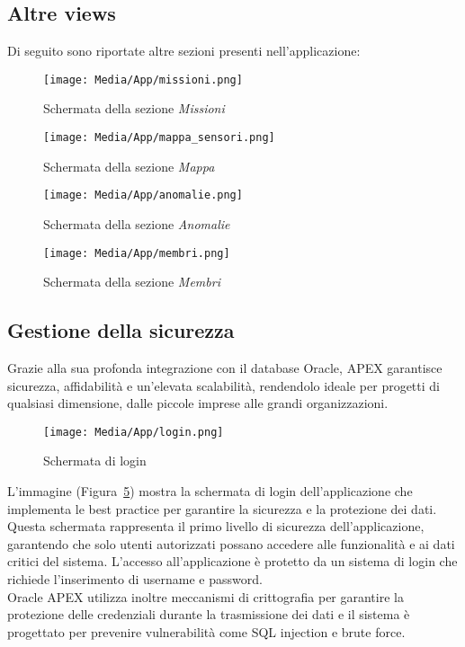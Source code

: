 \subsection{Altre views}
Di seguito sono riportate altre sezioni presenti nell'applicazione:
\begin{figure}[ht!]
    \centering
    \texttt{[image: Media/App/missioni.png]}
    \caption{Schermata della sezione \textit{Missioni}}
    \label{fig:missioni}
\end{figure}
\begin{figure}[ht!]
    \centering
    \texttt{[image: Media/App/mappa\_sensori.png]}
    \caption{Schermata della sezione \textit{Mappa}}
    \label{fig:mappa}
\end{figure}
\begin{figure}[ht!]
    \centering
    \texttt{[image: Media/App/anomalie.png]}
    \caption{Schermata della sezione \textit{Anomalie}}
    \label{fig:anomalie}
\end{figure}
\begin{figure}[ht!]
    \centering
    \texttt{[image: Media/App/membri.png]}
    \caption{Schermata della sezione \textit{Membri}}
    \label{fig:membri}
\end{figure}

\newpage
\subsection{Gestione della sicurezza}
\label{gestione-sicurezza}
Grazie alla sua profonda integrazione con il database Oracle, APEX garantisce sicurezza, affidabilità e un'elevata scalabilità, rendendolo ideale per progetti di qualsiasi dimensione, dalle piccole imprese alle grandi organizzazioni. \\

\begin{figure}[ht!]
    \centering
    \texttt{[image: Media/App/login.png]}
    \caption{Schermata di login}
    \label{fig:login}
\end{figure}

\noindent
L'immagine (Figura~\ref{fig:login}) mostra la schermata di login dell'applicazione che implementa le best practice per garantire la sicurezza e la protezione dei dati. Questa schermata rappresenta il primo livello di sicurezza dell'applicazione, garantendo che solo utenti autorizzati possano accedere alle funzionalità e ai dati critici del sistema.
L'accesso all'applicazione è protetto da un sistema di login che richiede l'inserimento di username e password.\\
Oracle APEX utilizza inoltre meccanismi di crittografia per garantire la protezione delle credenziali durante la trasmissione dei dati e il sistema è progettato per prevenire vulnerabilità come SQL injection e brute force.\\

